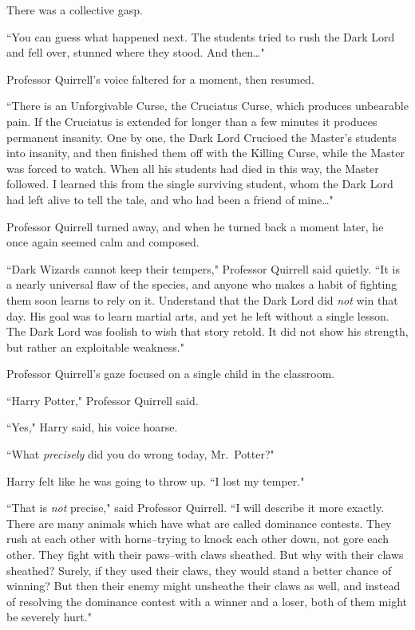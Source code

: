 There was a collective gasp.

``You can guess what happened next. The students tried to rush the Dark Lord and fell over, stunned where they stood. And then{\ldots}"

Professor Quirrell's voice faltered for a moment, then resumed.

``There is an Unforgivable Curse, the Cruciatus Curse, which produces unbearable pain. If the Cruciatus is extended for longer than a few minutes it produces permanent insanity. One by one, the Dark Lord Crucioed the Master's students into insanity, and then finished them off with the Killing Curse, while the Master was forced to watch. When all his students had died in this way, the Master followed. I learned this from the single surviving student, whom the Dark Lord had left alive to tell the tale, and who had been a friend of mine{\ldots}"

Professor Quirrell turned away, and when he turned back a moment later, he once again seemed calm and composed.

``Dark Wizards cannot keep their tempers," Professor Quirrell said quietly. ``It is a nearly universal flaw of the species, and anyone who makes a habit of fighting them soon learns to rely on it. Understand that the Dark Lord did \emph{not} win that day. His goal was to learn martial arts, and yet he left without a single lesson. The Dark Lord was foolish to wish that story retold. It did not show his strength, but rather an exploitable weakness."

Professor Quirrell's gaze focused on a single child in the classroom.

``Harry Potter," Professor Quirrell said.

``Yes," Harry said, his voice hoarse.

``What \emph{precisely} did you do wrong today, Mr.~Potter?"

Harry felt like he was going to throw up. ``I lost my temper."

``That is \emph{not} precise," said Professor Quirrell. ``I will describe it more exactly. There are many animals which have what are called dominance contests. They rush at each other with horns\---trying to knock each other down, not gore each other. They fight with their paws\---with claws sheathed. But why with their claws sheathed? Surely, if they used their claws, they would stand a better chance of winning? But then their enemy might unsheathe their claws as well, and instead of resolving the dominance contest with a winner and a loser, both of them might be severely hurt."

